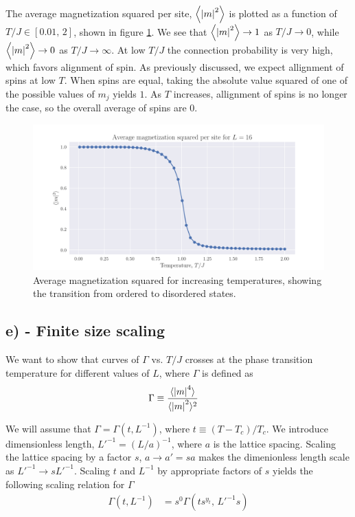 \documentclass[reprint,english,notitlepage,aps,nobalancelastpage,nofootinbib]{revtex4-1}
\newcommand{\tj}{T/J}
\begin{document}
The average magnetization squared per site, $\expval{\abs{m}^2}$ is plotted as a function of $\tj\in[0.01,\,2]$, shown in figure \ref{fig:avg_mag_squared}. We see that $\expval{\abs{m}^2}\to1$ as $\tj\to0$, while $\expval{\abs{m}^2}\to0$ as $\tj\to\infty$. At low $\tj$ the connection probability is very high, which favors alignment of spin. As previously discussed, we expect allignment of spins at low $T$. When spins are equal, taking the absolute value squared of one of the possible values of $m_j$ yields $1$. As $T$ increases, allignment of spins is no longer the case, so the overall average of spins are $0$.  

\begin{figure}[h!]
	\centering
	\includegraphics[width=0.7\linewidth]{avg_mag_squared.pdf}
	\caption{Average magnetization squared for increasing temperatures, showing the transition from ordered to disordered states.}
	\label{fig:avg_mag_squared}
\end{figure}

\subsection*{e) - Finite size scaling}

We want to show that curves of $\Gamma$ vs. $\tj$ crosses at the phase transition temperature for different values of $L$, where $\Gamma$ is defined as 
\begin{align*}
	\Gamma &\equiv \frac{\langle\abs{m}^4\rangle}{\langle\abs{m}^2\rangle ^2}
\end{align*}

We will assume that $\Gamma=\Gamma(t,L^{-1})$, where $t\equiv(T-T_c)/T_c$. We introduce dimensionless length, $L'^{-1}=(L/a)^{-1}$, where $a$ is the lattice spacing. Scaling the lattice spacing by a factor $s$, $a\to a'=sa$ makes the dimenionless length scale as $L'^{-1}\to sL'^{-1}$. Scaling $t$ and $L^{-1}$ by appropriate factors of $s$ yields the following scaling relation for $\Gamma$
\begin{align*}
	\Gamma(t,L^{-1}) &= s^0 \Gamma(t s^{y_t},\,L'^{-1} s)
\end{align*}
\end{document}
